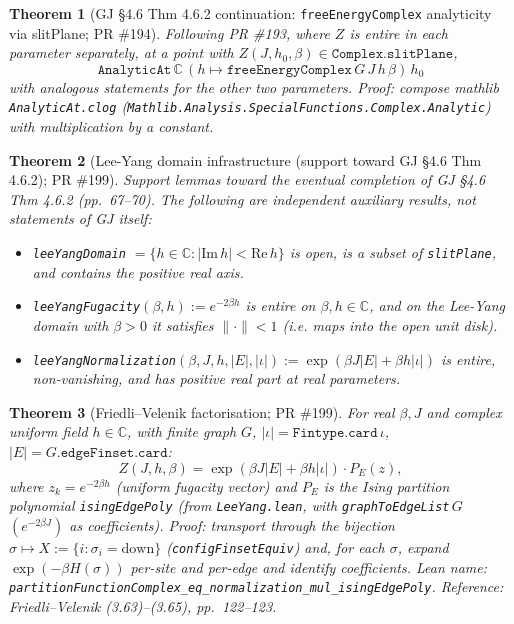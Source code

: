 \documentclass[a4paper,11pt]{article}
\newtheorem{theorem}{Theorem}
\begin{document}
\begin{theorem}[GJ \S 4.6 Thm 4.6.2 continuation: \texttt{freeEnergyComplex} analyticity via slitPlane; PR \#194]
Following PR \#193, where $Z$ is entire in each parameter separately, at a
point with $Z(J, h_0, \beta) \in \texttt{Complex.slitPlane}$,
\[
  \texttt{AnalyticAt}\,\mathbb C\,
    (h \mapsto \texttt{freeEnergyComplex}\,G\,J\,h\,\beta)\,h_0
\]
with analogous statements for the other two parameters. Proof: compose
mathlib \texttt{AnalyticAt.clog}
(\texttt{Mathlib.Analysis.SpecialFunctions.Complex.Analytic}) with
multiplication by a constant.
\end{theorem}

\begin{theorem}[Lee-Yang domain infrastructure (support toward GJ \S 4.6 Thm 4.6.2); PR \#199]
Support lemmas toward the eventual completion of GJ \S 4.6 Thm 4.6.2
(pp.~67--70). The following are independent auxiliary results, not
statements of GJ itself:
\begin{itemize}
\item \texttt{leeYangDomain} $= \{h \in \mathbb C : |\mathrm{Im}\,h| < \mathrm{Re}\,h\}$
 is open, is a subset of \texttt{slitPlane}, and contains the positive
 real axis.
\item \texttt{leeYangFugacity}$(\beta, h) := e^{-2\beta h}$ is entire
 on $\beta, h \in \mathbb C$, and on the Lee-Yang domain with
 $\beta > 0$ it satisfies $\|\cdot\| < 1$ (i.e. maps into the open
 unit disk).
\item \texttt{leeYangNormalization}$(\beta, J, h, |E|, |\iota|)
 := \exp(\beta J |E| + \beta h |\iota|)$ is entire, non-vanishing, and
 has positive real part at real parameters.
\end{itemize}
\end{theorem}

\begin{theorem}[Friedli--Velenik factorisation; PR \#199]
\label{thm:friedli-velenik}
For real $\beta, J$ and complex uniform field $h \in \mathbb C$,
with finite graph $G$, $|\iota| = \texttt{Fintype.card}\,\iota$,
$|E| = G.\texttt{edgeFinset.card}$:
\[
  Z(J, h, \beta)
    = \exp(\beta J |E| + \beta h |\iota|) \cdot P_E(z),
\]
where $z_k = e^{-2\beta h}$ (uniform fugacity vector) and $P_E$ is the
Ising partition polynomial \texttt{isingEdgePoly}
(from \texttt{LeeYang.lean}, with
\texttt{graphToEdgeList}\,$G$\,$(e^{-2\beta J})$ as coefficients).
Proof: transport through the bijection
$\sigma \mapsto X := \{i : \sigma_i = \mathrm{down}\}$
(\texttt{configFinsetEquiv}) and, for each $\sigma$, expand
$\exp(-\beta H(\sigma))$ per-site and per-edge and identify
coefficients.
Lean name: \texttt{partitionFunctionComplex\_eq\_normalization\_mul\_isingEdgePoly}.
Reference: Friedli--Velenik (3.63)--(3.65), pp.~122--123.
\end{theorem}
\end{document}
